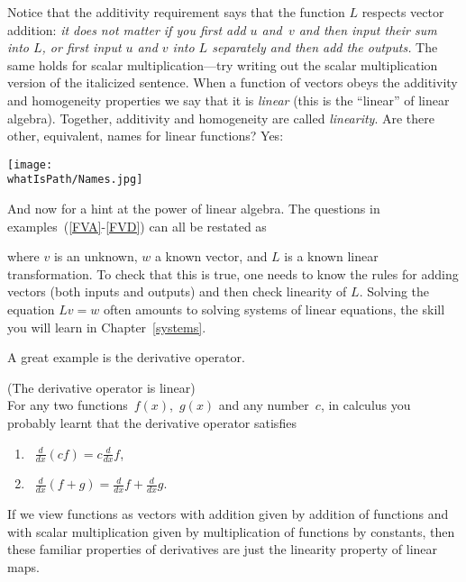 Notice that the additivity 
requirement says that the function $L$ respects vector addition: {\itshape it does not matter if you first add $u$ and~$v$ and then input their sum into
$L$, or first input $u$ and $v$ into $L$ separately and then add the outputs.} The same holds for scalar multiplication---try writing out the scalar multiplication version of the italicized sentence. When a function of vectors obeys the additivity and homogeneity properties we say that it is {\itshape linear} (this is the ``linear'' of linear algebra). Together, additivity and homogeneity are called {\itshape linearity}. 
Are there other, equivalent, names for linear functions? Yes:
\begin{center}
\texttt{[image: \\whatIsPath/Names.jpg]}
\\
\end{center}

And now for a hint at the power of linear algebra. 
The questions in examples~(\ref{FVA}-\ref{FVD}) can all be restated as %
\begin{center}
\end{center}
where $v$ is an unknown, $w$ a known vector, and $L$ is  a known linear transformation.
To check that this is true, one needs to know the rules for adding vectors (both inputs and outputs)
and then check linearity of $L$. Solving the equation $Lv=w$ often amounts  to solving systems of linear equations,
the skill you will learn in  Chapter~\ref{systems}.



A great example is the derivative operator.
\begin{example} (The derivative operator is linear)\\
For any two functions~$f(x)$,~$g(x)$ and any number~$c$, in calculus you probably learnt that the derivative operator satisfies
\begin{enumerate}
\item ~$\frac{d}{dx} (cf)=c\frac{d}{dx} f$, \\[-.5cm]
\item~$\frac{d}{dx}(f+g)=\frac{d}{dx}f+\frac{d}{dx}g$.\\[-.5cm]
\end{enumerate}
If we view functions  as vectors with addition given by addition of functions and with scalar multiplication given by multiplication of functions by constants, then these familiar properties of derivatives are just the linearity property of linear maps.
\end{example}

